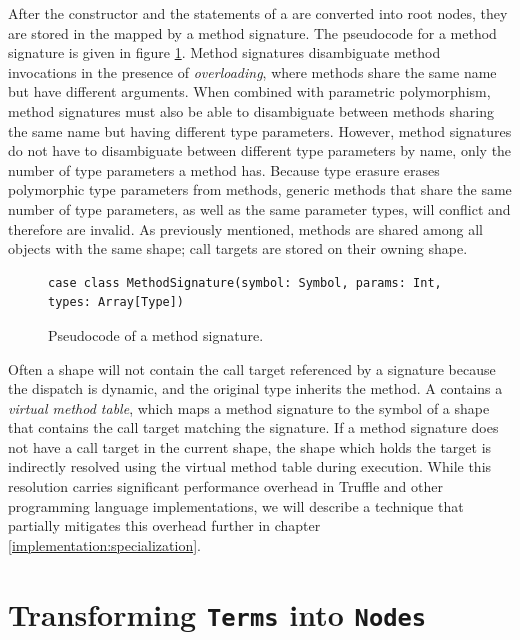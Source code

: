 After the constructor and the  statements of a  are converted into root nodes, they are stored in the  mapped by a method signature.
The pseudocode for a method signature is given in figure \ref{impl:method-signature}.
Method signatures disambiguate method invocations in the presence of \textit{overloading}\cite{strachey:fundamental-concepts}, where methods share the same name but have different arguments.
When combined with parametric polymorphism, method signatures must also be able to disambiguate between methods sharing the same name but having different type parameters.
However, method signatures do not have to disambiguate between different type parameters by name, only the number of type parameters a method has.
Because type erasure erases polymorphic type parameters from methods, generic methods that share the same number of type parameters, as well as the same parameter types, will conflict and therefore are invalid.
As previously mentioned, methods are shared among all  objects with the same shape; call targets are stored on their owning shape.

\begin{figure}[!htb]
\begin{verbatim}
case class MethodSignature(symbol: Symbol, params: Int, types: Array[Type])
\end{verbatim}
\caption{Pseudocode of a method signature.}
\label{impl:method-signature}
\end{figure}

Often a shape will not contain the call target referenced by a signature because the dispatch is dynamic, and the original type inherits the method.
A  contains a \textit{virtual method table}, which maps a method signature to the symbol of a shape that contains the call target matching the signature.
If a method signature does not have a call target in the current shape, the shape which holds the target is indirectly resolved using the virtual method table during execution.
While this resolution carries significant performance overhead in Truffle and other programming language implementations, we will describe a technique that partially mitigates this overhead further in chapter \ref{implementation:specialization}.

\section{Transforming \texttt{Terms} into \texttt{Nodes}}

